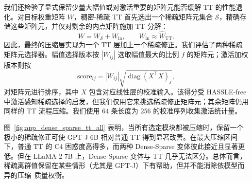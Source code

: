\documentclass[11pt]{article}
\begin{document}
\begin{appendixpart}
我们还检验了显式保留少量大幅值或对激活重要的矩阵元能否缓解 TT 的性能退化。对目标权重矩阵 $W$，稠密-稀疏 TT 首先选出一个稀疏矩阵元集合 $\mathcal{S}$，精确存储这些矩阵元，并仅对剩余的内点矩阵施加 TT 分解：
\[
    W = W_{\mathcal{S}} + W_{\mathrm{in}},
    \qquad
    W_{\mathrm{in}} \approx \widehat{W}_{\mathrm{TT}} .
\]
因此，最终的压缩层实现为一个 TT 层加上一个稀疏修正。我们评估了两种稀疏矩阵元选择器。幅值选择版本按 $|W_{ij}|$ 选取幅值最大的比例 $f$ 的矩阵元；激活加权版本则按
\[
    \mathrm{score}_{ij}
    =
    |W_{ij}|
    \sqrt{\operatorname{diag}(X^\top X)_j},
\]
对矩阵元进行排序，其中 $X$ 包含对应线性层的校准输入。该得分受 HASSLE-free 中激活感知稀疏选择的启发，但我们仅用它来挑选稀疏修正矩阵元；其余矩阵仍用同样的 TT 流程压缩。我们使用 64 条长度为 256 的校准序列收集激活统计量。

图~\ref{fig:app_dense_sparse_tt_all} 表明，当所有选定模块都被压缩时，保留一个极小的稀疏修正可使 GPT-J 6B 相对普通 TT 得到显著改善。在最大压缩区间下，普通 TT 的 C4 困惑度高得多，而两种 Dense-Sparse 变体彼此接近且显著更低。但在 LLaMA 2 7B 上，Dense-Sparse 变体与 TT 几乎无法区分。总体而言，稀疏离群值保留在某些情形（尤其是 GPT-J）下有帮助，但并不能消除依模型而异的压缩--质量权衡。



\end{appendixpart}
\end{document}
